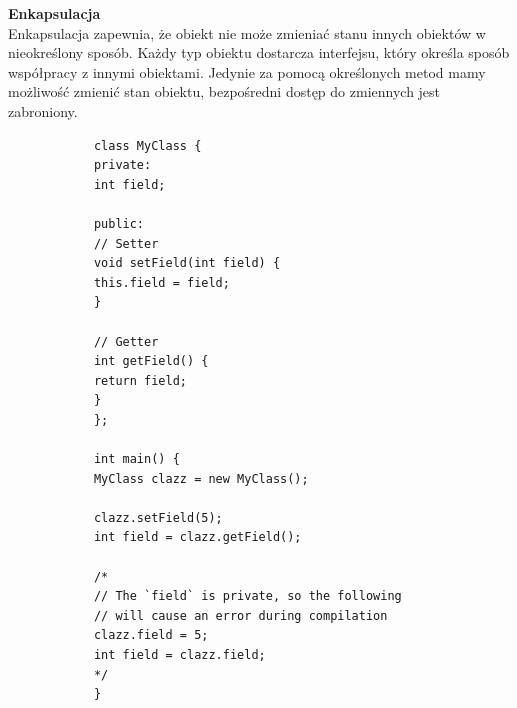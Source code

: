 \documentclass[12pt]{article}
\begin{document}
    \begin{definition}
        \textbf{Enkapsulacja} \\
        Enkapsulacja zapewnia, że obiekt nie może zmieniać stanu innych obiektów w nieokreślony sposób.
        Każdy typ obiektu dostarcza interfejsu, który określa sposób współpracy z innymi obiektami.
        Jedynie za pomocą określonych metod mamy możliwość zmienić stan obiektu, bezpośredni dostęp
        do zmiennych jest zabroniony.
        \begin{verbatim}
            class MyClass {
            private:
            int field;

            public:
            // Setter
            void setField(int field) {
            this.field = field;
            }

            // Getter
            int getField() {
            return field;
            }
            };

            int main() {
            MyClass clazz = new MyClass();

            clazz.setField(5);
            int field = clazz.getField();

            /*
            // The `field` is private, so the following
            // will cause an error during compilation
            clazz.field = 5;
            int field = clazz.field;
            */
            }
        \end{verbatim}
    \end{definition}
\end{document}

